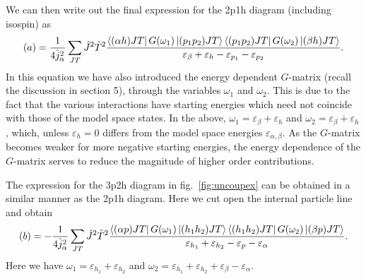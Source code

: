 We can then write out the final expression for the 
2p1h diagram (including isospin) as
\begin{equation}
     (a)= \frac{1}{4\hat{j}_{\alpha}^2}\sum_{JT}\hat{J}^2\hat{T}^2
     \frac{\left\langle (\alpha h)JT \right|G(\omega_1)
     \left| (p_1p_2)JT \right\rangle\left\langle (p_1p_2)JT \right|G(\omega_2)\left| (\beta h)JT \right\rangle}
     {\varepsilon_{\beta} +\varepsilon_h -\varepsilon_{p_1}-\varepsilon_{p_2}}.
\end{equation}
In this equation we have also introduced the energy dependent $G$-matrix
(recall the discussion in section 5), through the variables $\omega_1$ 
and $\omega_2$. This is due to the fact that the various interactions
have starting energies which need not coincide with those of the model
space states. In the above, $\omega_1= \varepsilon_{\beta}+\varepsilon_h$
and $\omega_2= \varepsilon_{\beta}+\varepsilon_h$, which, unless
$\varepsilon_h=0$ differs from the model space energies
$\varepsilon_{\alpha ,\beta}$. As the $G$-matrix becomes weaker for more
negative starting energies, the energy dependence of the $G$-matrix serves
to reduce the magnitude of higher order contributions.

The expression for the 3p2h diagram in fig.\ \ref{fig:uncoupex} can be obtained
in a similar manner as the 2p1h diagram. Here we cut open the internal particle
line and obtain
\begin{equation}
    (b)= -\frac{1}{4\hat{j}_{\alpha}^2}\sum_{JT}\hat{J}^2\hat{T}^2
    \frac{\left\langle (\alpha p)JT \right|G(\omega_1)
    \left| (h_1h_2)JT \right\rangle\left\langle (h_1h_2)JT \right|G(\omega_2)\left| (\beta p)JT \right\rangle}
    {\varepsilon_{h_1} +\varepsilon_{h_2} -\varepsilon_p-\varepsilon_{\alpha}}.
\end{equation}
Here we have $\omega_1= \varepsilon_{h_1}+\varepsilon_{h_2}$
and $\omega_2= \varepsilon_{h_1}+\varepsilon_{h_2}
+\varepsilon_{\beta}-\varepsilon_{\alpha}$.



